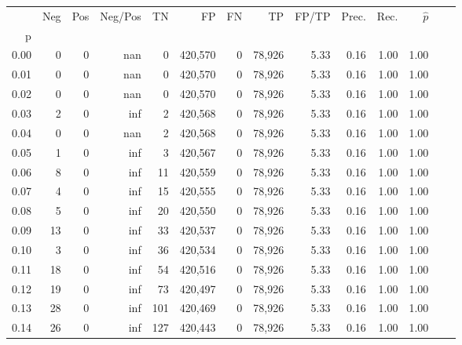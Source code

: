 \begin{tabular}{rrrrrrrrrrrrrr}
\toprule
{} &     Neg &    Pos & Neg/Pos &       TN &       FP &      FN &      TP & FP/TP & Prec. &  Rec. & $\hat{p}$ \\
p    &         &        &         &          &          &         &         &       &       &       &           \\
\midrule
0.00 &       0 &      0 &     nan &        0 &  420,570 &       0 &  78,926 &  5.33 &  0.16 &  1.00 &      1.00 \\
0.01 &       0 &      0 &     nan &        0 &  420,570 &       0 &  78,926 &  5.33 &  0.16 &  1.00 &      1.00 \\
0.02 &       0 &      0 &     nan &        0 &  420,570 &       0 &  78,926 &  5.33 &  0.16 &  1.00 &      1.00 \\
0.03 &       2 &      0 &     inf &        2 &  420,568 &       0 &  78,926 &  5.33 &  0.16 &  1.00 &      1.00 \\
0.04 &       0 &      0 &     nan &        2 &  420,568 &       0 &  78,926 &  5.33 &  0.16 &  1.00 &      1.00 \\
0.05 &       1 &      0 &     inf &        3 &  420,567 &       0 &  78,926 &  5.33 &  0.16 &  1.00 &      1.00 \\
0.06 &       8 &      0 &     inf &       11 &  420,559 &       0 &  78,926 &  5.33 &  0.16 &  1.00 &      1.00 \\
0.07 &       4 &      0 &     inf &       15 &  420,555 &       0 &  78,926 &  5.33 &  0.16 &  1.00 &      1.00 \\
0.08 &       5 &      0 &     inf &       20 &  420,550 &       0 &  78,926 &  5.33 &  0.16 &  1.00 &      1.00 \\
0.09 &      13 &      0 &     inf &       33 &  420,537 &       0 &  78,926 &  5.33 &  0.16 &  1.00 &      1.00 \\
0.10 &       3 &      0 &     inf &       36 &  420,534 &       0 &  78,926 &  5.33 &  0.16 &  1.00 &      1.00 \\
0.11 &      18 &      0 &     inf &       54 &  420,516 &       0 &  78,926 &  5.33 &  0.16 &  1.00 &      1.00 \\
0.12 &      19 &      0 &     inf &       73 &  420,497 &       0 &  78,926 &  5.33 &  0.16 &  1.00 &      1.00 \\
0.13 &      28 &      0 &     inf &      101 &  420,469 &       0 &  78,926 &  5.33 &  0.16 &  1.00 &      1.00 \\
0.14 &      26 &      0 &     inf &      127 &  420,443 &       0 &  78,926 &  5.33 &  0.16 &  1.00 &      1.00 \\

\end{tabular}
